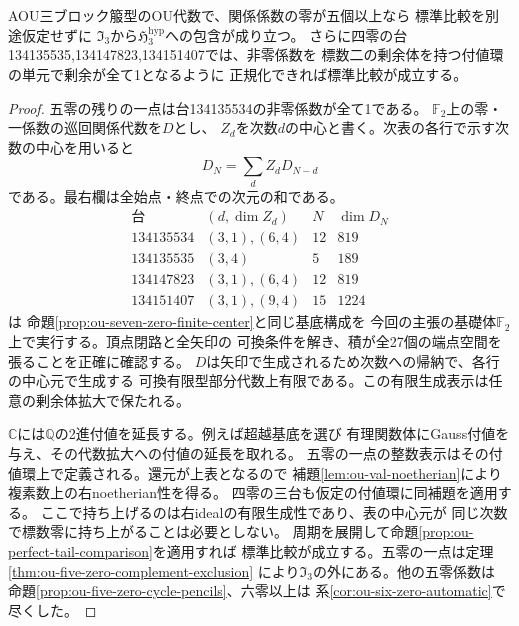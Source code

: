 \begin{theorem}[五零以上の全特殊化と標数二の中心証明書]
\label{thm:ou-five-zero-automatic}
AOU三ブロック箙型のOU代数で、関係係数の零が五個以上なら
標準比較を別途仮定せずに
$\mathfrak I_3$から$\mathfrak H^{\mathrm{hyp}}_3$への包含が成り立つ。
さらに四零の台134135535,134147823,134151407では、非零係数を
標数二の剰余体を持つ付値環の単元で剰余が全て1となるように
正規化できれば標準比較が成立する。
\end{theorem}
\begin{proof}
五零の残りの一点は台134135534の非零係数が全て1である。
$\mathbb F_2$上の零・一係数の巡回関係代数を$D$とし、
$Z_d$を次数$d$の中心と書く。次表の各行で示す次数の中心を用いると
\[
                D_N=\sum_{d}Z_dD_{N-d}
\]
である。最右欄は全始点・終点での次元の和である。
\[
\begin{array}{c|l|r|r}
\text{台}&(d,\dim Z_d)&N&\dim D_N\\\hline
134135534&(3,1),(6,4)&12&819\\
134135535&(3,4)&5&189\\
134147823&(3,1),(6,4)&12&819\\
134151407&(3,1),(9,4)&15&1224
\end{array}
\]
は
命題\ref{prop:ou-seven-zero-finite-center}と同じ基底構成を
今回の主張の基礎体$\mathbb F_2$上で実行する。頂点閉路と全矢印の
可換条件を解き、積が全27個の端点空間を張ることを正確に確認する。
$D$は矢印で生成されるため次数への帰納で、各行の中心元で生成する
可換有限型部分代数上有限である。この有限生成表示は任意の剰余体拡大で保たれる。

$\mathbb C$には$\mathbb Q$の2進付値を延長する。例えば超越基底を選び
有理関数体にGauss付値を与え、その代数拡大への付値の延長を取れる。
五零の一点の整数表示はその付値環上で定義される。還元が上表となるので
補題\ref{lem:ou-val-noetherian}により複素数上の右noetherian性を得る。
四零の三台も仮定の付値環に同補題を適用する。
ここで持ち上げるのは右idealの有限生成性であり、表の中心元が
同じ次数で標数零に持ち上がることは必要としない。
周期を展開して命題\ref{prop:ou-perfect-tail-comparison}を適用すれば
標準比較が成立する。五零の一点は定理\ref{thm:ou-five-zero-complement-exclusion}
により$\mathfrak I_3$の外にある。他の五零係数は
命題\ref{prop:ou-five-zero-cycle-pencils}、六零以上は
系\ref{cor:ou-six-zero-automatic}で尽くした。
\end{proof}

